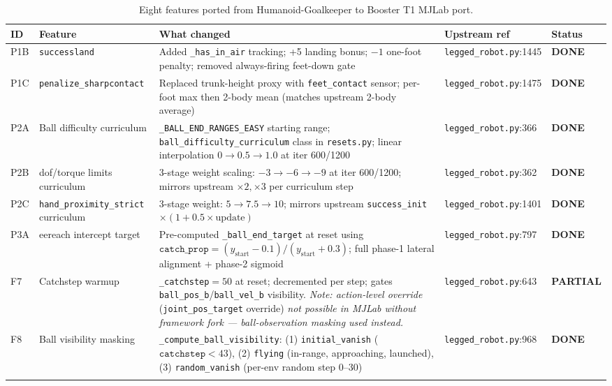 \documentclass[11pt,a4paper]{article}
\newcommand{\done}{\textcolor{done}{\textbf{DONE}}}
\newcommand{\partial}{\textcolor{partial}{\textbf{PARTIAL}}}
\begin{document}
\begin{longtable}{p{1.0cm} p{2.5cm} p{5.0cm} p{3.5cm} p{1.5cm}}
\toprule
\textbf{ID} & \textbf{Feature} & \textbf{What changed} & \textbf{Upstream ref} & \textbf{Status} \\
\midrule
\endhead
P1B & \texttt{successland} & Added \texttt{\_has\_in\_air} tracking; +5 landing bonus; $-1$ one-foot penalty; removed always-firing feet-down gate &
  \texttt{legged\_robot.py}:1445 & \done \\[6pt]

P1C & \texttt{penalize\-\_sharp\-contact} & Replaced trunk-height proxy with \texttt{feet\_contact} sensor; per-foot max then 2-body mean (matches upstream 2-body average) &
  \texttt{legged\_robot.py}:1475 & \done \\[6pt]

P2A & Ball difficulty curriculum & \texttt{\_BALL\_END\_RANGES\_EASY} starting range; \texttt{ball\_difficulty\_curriculum} class in \texttt{resets.py}; linear interpolation $0 \to 0.5 \to 1.0$ at iter 600/1200 &
  \texttt{legged\_robot.py}:366 & \done \\[6pt]

P2B & dof/torque limits curriculum & 3-stage weight scaling: $-3 \to -6 \to -9$ at iter 600/1200; mirrors upstream $\times 2, \times 3$ per curriculum step &
  \texttt{legged\_robot.py}:362 & \done \\[6pt]

P2C & \texttt{hand\_proximity\-\_strict} curriculum & 3-stage weight: $5 \to 7.5 \to 10$; mirrors upstream \texttt{success\_init} $\times (1 + 0.5 \times \text{update})$ &
  \texttt{legged\_robot.py}:1401 & \done \\[6pt]

P3A & eereach intercept target & Pre-computed \texttt{\_ball\_end\_target} at reset using $\texttt{catch\_prop} = (y_\text{start} - 0.1)/(y_\text{start} + 0.3)$; full phase-1 lateral alignment + phase-2 sigmoid &
  \texttt{legged\_robot.py}:797 & \done \\[6pt]

F7 & Catchstep warmup & \texttt{\_catchstep}$=50$ at reset; decremented per step; gates \texttt{ball\_pos\_b}/\texttt{ball\_vel\_b} visibility. \emph{Note: action-level override} (\texttt{joint\_pos\_target} override) \emph{not possible in MJLab without framework fork --- ball-observation masking used instead.} &
  \texttt{legged\_robot.py}:643 & \partial \\[6pt]

F8 & Ball visibility masking & \texttt{\_compute\_ball\_visibility}: (1) \texttt{initial\_vanish} ($\texttt{catchstep} < 43$), (2) \texttt{flying} (in-range, approaching, launched), (3) \texttt{random\_vanish} (per-env random step 0--30) &
  \texttt{legged\_robot.py}:968 & \done \\[6pt]
\bottomrule
\caption{Eight features ported from Humanoid-Goalkeeper to Booster T1 MJLab port.}
\end{longtable}
\end{document}
